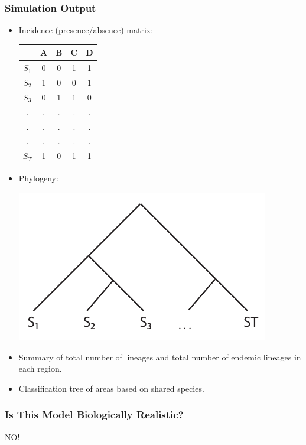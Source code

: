 \documentclass[11pt,t]{beamer}
\begin{document}
\begin{frame}
	\frametitle{Simulation Output}
	\begin{itemize}
		\item Incidence (presence/absence) matrix:\\
			\begin{center}
			{\tiny
			    \begin{tabular}{c|cccc}
			          & A & B & C & D\\
					\hline	             
			        $S_{1}$ & 0 & 0 & 1 & 1 \\
			        $S_{2}$ & 1 & 0 & 0 & 1 \\
			        $S_{3}$ & 0 & 1 & 1 & 0 \\
			        .    & . & . & . & . \\
			        .    & . & . & . & . \\
			        .    & . & . & . & . \\			        
			        $S_{T}$ & 1 & 0 & 1 & 1 \\
		        \end{tabular}		
			}
			\end{center}
		\item Phylogeny: \\
			\begin{center}
				\includegraphics[scale=0.4]{sample-phylogeny.pdf}
			\end{center}				
		\item Summary of total number of lineages and total number of endemic lineages in each region.
		\item Classification tree of areas based on shared species.
	\end{itemize}
\end{frame}

\begin{frame}
	\frametitle{Is This Model Biologically Realistic?}
	\begin{center}
		{\huge NO!}
	\end{center}
\end{frame}
\end{document}
